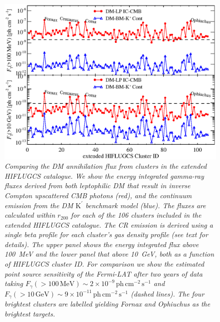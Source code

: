 \documentclass[10pt,aps,pra,reprint,amsmath,amsfonts,amssymb,showpacs,nofootinbib,floatfix]{revtex4-1}
\newcommand{\rmn}{\mathrm}
\newcommand{\Kp}{\rmn{K}^\prime}
\newcommand{\rvir}{r_{200}}
\begin{document}
\begin{figure}%
\begin{minipage}{2.0\columnwidth}
 \includegraphics[width=0.99\columnwidth]{figures/Flux.comp.DM.eps}
 \caption{\it Comparing the DM annihilation flux from clusters in the
   extended HIFLUGCS catalogue. We show the energy integrated
   gamma-ray fluxes derived from both leptophilic DM that result in
   inverse Compton upscattered CMB photons (red), and the continuum
   emission from the DM $\Kp$ benchmark model (blue). The fluxes are
   calculated within $\rvir$ for each of the 106 clusters included in
   the extended HIFLUGCS catalogue. The CR emission is derived using a
   single beta profile for each cluster's gas density profile (see
   text for details). The upper panel shows the energy integrated flux
   above 100~MeV and the lower panel that above 10~GeV, both as a
   function of HIFLUGCS cluster ID. For comparison we show the
   estimated point source sensitivity of the Fermi-LAT after two years
   of data taking $F_\gamma(>100\,\rmn{MeV})\sim
   2\times10^{-9}\,\rmn{ph}\, \rmn{cm}^{-2}\,\rmn{s}^{-1}$ and
   $F_\gamma(>10\,\rmn{GeV})\sim 9\times10^{-11}\,\rmn{ph}\,
   \rmn{cm}^{-2}\,\rmn{s}^{-1}$ (dashed lines). The four brightest
   clusters are labelled yielding Fornax and Ophiuchus as the
   brightest targets.}
 \label{fig21}
\end{minipage}
\end{figure}
\end{document}
